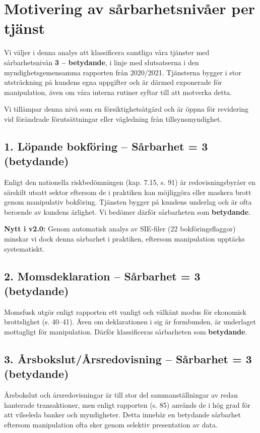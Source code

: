 \documentclass{article}
\begin{document}
\newpage
\section*{Motivering av sårbarhetsnivåer per tjänst}

Vi väljer i denna analys att klassificera samtliga våra tjänster med sårbarhetsnivån \textbf{3 – betydande}, i linje med slutsatserna i den myndighetsgemensamma rapporten från 2020/2021. Tjänsterna bygger i stor utsträckning på kundens egna uppgifter och är därmed exponerade för manipulation, även om våra interna rutiner syftar till att motverka detta. 

Vi tillämpar denna nivå som en försiktighetsåtgärd och är öppna för revidering vid förändrade förutsättningar eller vägledning från tillsynsmyndighet.

\subsection*{1. Löpande bokföring – Sårbarhet = 3 (betydande)}
Enligt den nationella riskbedömningen (kap. 7.15, s. 91) är redovisningsbyråer en särskilt utsatt sektor eftersom de i praktiken kan möjliggöra eller maskera brott genom manipulativ bokföring. Tjänsten bygger på kundens underlag och är ofta beroende av kundens ärlighet. Vi bedömer därför sårbarheten som \textbf{betydande}.

\textbf{Nytt i v2.0:} Genom automatisk analys av SIE-filer (22 bokföringsflaggor) minskar vi dock denna sårbarhet i praktiken, eftersom manipulation upptäcks systematiskt.

\subsection*{2. Momsdeklaration – Sårbarhet = 3 (betydande)}
Momsfusk utgör enligt rapporten ett vanligt och välkänt modus för ekonomisk brottslighet (s. 40--41). Även om deklarationen i sig är formbunden, är underlaget mottagligt för manipulation. Därför klassificeras sårbarheten som \textbf{betydande}.

\subsection*{3. Årsbokslut/Årsredovisning – Sårbarhet = 3 (betydande)}
Årsbokslut och årsredovisningar är till stor del sammanställningar av redan hanterade transaktioner, men enligt rapporten (s. 85) används de i hög grad för att vilseleda banker och myndigheter. Detta innebär en betydande sårbarhet eftersom manipulation ofta sker genom selektiv presentation av data.
\end{document}
